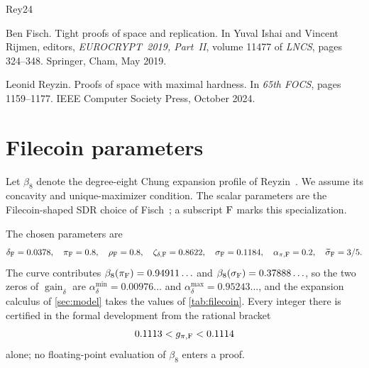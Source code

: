 \documentclass[11pt]{article}
\theoremstyle{plain}
\theoremstyle{remark}
\newcommand{\gaind}{\operatorname{gain}_{\delta}}
\newcommand{\sigmatilde}{\widetilde{\sigma}}
\begin{document}
\begin{thebibliography}{Rey24}

Ben Fisch.
\newblock Tight proofs of space and replication.
\newblock In Yuval Ishai and Vincent Rijmen, editors, {\em EUROCRYPT~2019,
  Part~II}, volume 11477 of {\em {LNCS}}, pages 324--348. Springer, Cham, May
  2019.

Leonid Reyzin.
\newblock Proofs of space with maximal hardness.
\newblock In {\em 65th FOCS}, pages 1159--1177. {IEEE} Computer Society Press,
  October 2024.

\end{thebibliography}

\appendix
{}
\renewcommand{\theHsection}{\Alph{section}}
\renewcommand{\theHsubsection}{\Alph{section}.\arabic{subsection}}

\section{Filecoin parameters}
\label{app:filecoin}
Let \(\beta_8\) denote the degree-eight Chung expansion profile of
Reyzin~\cite[Claims 11 and 13]{FOCS:Reyzin24}.  We assume its concavity and
unique-maximizer condition.  The scalar parameters are the Filecoin-shaped SDR choice
of Fisch~\cite{EC:Fisch19}; a subscript \({\rm F}\) marks this specialization.

The chosen parameters are
\begin{equation}
 \delta_{\rm F}=0.0378,\quad
 \pi_{\rm F}=0.8,\quad
 \rho_{\rm F}=0.8,\quad
 \zeta_{\delta,{\rm F}}=0.8622,\quad
 \sigma_{\rm F}=0.1184,\quad
 \alpha_{\pi,{\rm F}}=0.2,\quad
 \sigmatilde_{\rm F}=3/5 .
 \label{eq:filecoin-parameters}
\end{equation}
The curve contributes \(\beta_8(\pi_{\rm F})=0.94911\ldots\) and
\(\beta_8(\sigma_{\rm F})=0.37888\ldots\), so the two zeros of \(\gaind\) are
\(\alpha_\delta^{\min}=0.00976\ldots\) and \(\alpha_\delta^{\max}=0.95243\ldots\), and
the expansion calculus of \cref{sec:model} takes the values of \cref{tab:filecoin}.
Every integer there is certified in the formal development from the rational bracket
\begin{equation}
 0.1113<g_{\pi,{\rm F}}<0.1114
 \label{eq:gpi-bracket}
\end{equation}
alone; no floating-point evaluation of \(\beta_8\) enters a proof.
\end{document}
